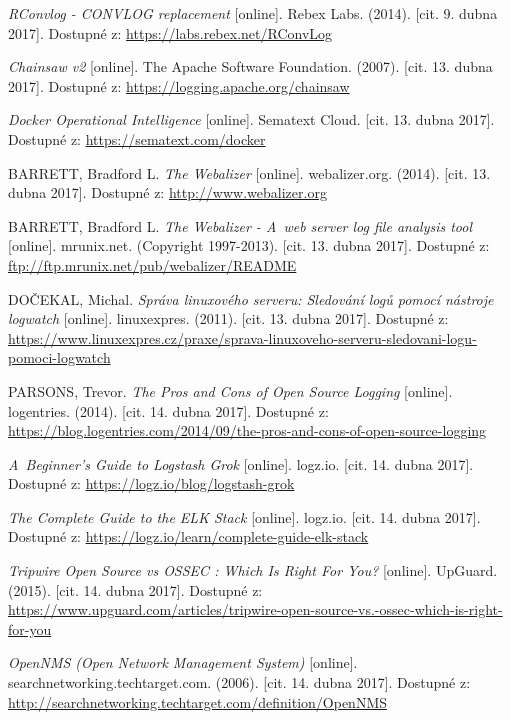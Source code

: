 \documentclass[thesis=B,czech]{FITthesis}[2012/06/26]
\begin{document}
\begin{thebibliography}{9}
	\textit{RConvlog - CONVLOG replacement} [online]. Rebex Labs. (2014). [cit. 9. dubna 2017]. Dostupné z: \url{https://labs.rebex.net/RConvLog}
	
	\textit{Chainsaw v2} [online]. The Apache Software Foundation. (2007). [cit. 13. dubna 2017]. Dostupné z: \url{https://logging.apache.org/chainsaw}
	
	\textit{Docker Operational Intelligence} [online]. Sematext Cloud. [cit. 13. dubna 2017]. Dostupné z: \url{https://sematext.com/docker}
	
	BARRETT, Bradford L. \textit{The Webalizer} [online]. webalizer.org. (2014). [cit. 13. dubna 2017]. Dostupné z: \url{http://www.webalizer.org}
	
	BARRETT, Bradford L. \textit{The Webalizer - A~web server log file analysis tool} [online]. mrunix.net. (Copyright 1997-2013). [cit. 13. dubna 2017]. Dostupné z: \url{ftp://ftp.mrunix.net/pub/webalizer/README}
	
	DOČEKAL, Michal. \textit{Správa linuxového serveru: Sledování logů pomocí nástroje logwatch} [online]. linuxexpres. (2011). [cit. 13. dubna 2017]. Dostupné z: \url{https://www.linuxexpres.cz/praxe/sprava-linuxoveho-serveru-sledovani-logu-pomoci-logwatch}
		
	PARSONS, Trevor. \textit{The Pros and Cons of Open Source Logging} [online]. logentries. (2014). [cit. 14. dubna 2017]. Dostupné z: \url{https://blog.logentries.com/2014/09/the-pros-and-cons-of-open-source-logging}		
	
	\textit{A~Beginner’s Guide to Logstash Grok} [online]. logz.io. [cit. 14. dubna 2017]. Dostupné z: \url{https://logz.io/blog/logstash-grok}
		
	\textit{The Complete Guide to the ELK Stack} [online]. logz.io. [cit. 14. dubna 2017]. Dostupné z: \url{https://logz.io/learn/complete-guide-elk-stack}
	
	\textit{Tripwire Open Source vs OSSEC : Which Is Right For You?} [online]. UpGuard. (2015). [cit. 14. dubna 2017]. Dostupné z: \url{https://www.upguard.com/articles/tripwire-open-source-vs.-ossec-which-is-right-for-you}
	
	\textit{OpenNMS (Open Network Management System)} [online]. searchnetworking.techtarget.com. (2006). [cit. 14. dubna 2017]. Dostupné z: \url{http://searchnetworking.techtarget.com/definition/OpenNMS}
	

\end{thebibliography}
\end{document}
